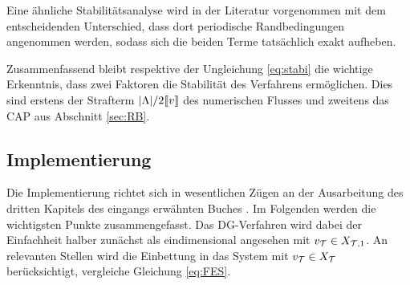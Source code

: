 Eine ähnliche Stabilitätsanalyse wird in der Literatur \cite{NLS} vorgenommen mit dem entscheidenden Unterschied, dass dort periodische Randbedingungen angenommen werden, sodass sich die beiden Terme tatsächlich exakt aufheben.

Zusammenfassend bleibt respektive der Ungleichung \eqref{eq:stabi} die wichtige Erkenntnis, dass zwei Faktoren die Stabilität des Verfahrens ermöglichen. Dies sind erstens der Strafterm $|\Lambda|/2\llbracket v \rrbracket$ des numerischen Flusses und zweitens das CAP aus Abschnitt \ref{sec:RB}.

\subsection{Implementierung}
Die Implementierung richtet sich in wesentlichen Zügen an der Ausarbeitung des dritten Kapitels des eingangs erwähnten Buches \cite{buch}. Im Folgenden werden die wichtigsten Punkte zusammengefasst. Das DG-Verfahren wird dabei der Einfachheit halber zunächst als eindimensional angesehen mit $v_{\mathcal{T}} \in X_{\mathcal{T},1}$. An relevanten Stellen wird die Einbettung in das System mit $v_{\mathcal{T}} \in X_{\mathcal{T}}$ berücksichtigt, vergleiche Gleichung \eqref{eq:FES}.

